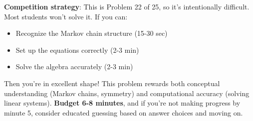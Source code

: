 \documentclass[12pt]{article}
\begin{document}
\begin{protipbox}
\textbf{Competition strategy}: This is Problem 22 of 25, so it's intentionally difficult. Most students won't solve it. If you can:
\begin{itemize}
    \item Recognize the Markov chain structure (15-30 sec)
    \item Set up the equations correctly (2-3 min)
    \item Solve the algebra accurately (2-3 min)
\end{itemize}
Then you're in excellent shape! This problem rewards both conceptual understanding (Markov chains, symmetry) and computational accuracy (solving linear systems). \textbf{Budget 6-8 minutes}, and if you're not making progress by minute 5, consider educated guessing based on answer choices and moving on.
\end{protipbox}
\end{document}
